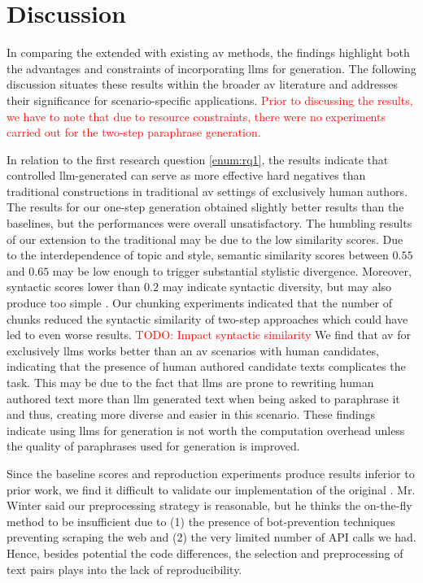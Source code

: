 \chapter{Discussion}
\label{chap:discussion}

In comparing the extended \impAppr{} with existing \ac{av} methods, the findings highlight both the advantages and constraints of incorporating \acp{llm} for \imp{} generation. 
The following discussion situates these results within the broader \ac{av} literature and addresses their significance for scenario-specific applications.
\textcolor{red}{Prior to discussing the results, we have to note that due to resource constraints, there were no experiments carried out for the two-step paraphrase \imp{} generation.}

In relation to the first research question \autoref{enum:rq1}, the results indicate that controlled \ac{llm}-generated \imps{} can serve as more effective hard negatives than traditional constructions in traditional \ac{av} settings of exclusively human authors.
The results for our one-step \imp{} generation obtained slightly better results than the baselines, but the performances were overall unsatisfactory.
The humbling results of our extension to the traditional \impAppr{} may be due to the low similarity scores.
Due to the interdependence of topic and style, semantic similarity scores between $0.55$ and $0.65$ may be low enough to trigger substantial stylistic divergence.
Moreover, syntactic scores lower than $0.2$ may indicate syntactic diversity, but may also produce too simple \imps{}.
Our chunking experiments indicated that the number of chunks reduced the syntactic similarity of two-step approaches which could have led to even worse results.
\textcolor{red}{TODO: Impact syntactic similarity}
We find that \ac{av} for exclusively \acp{llm} works better than an \ac{av} scenarios with human candidates, indicating that the presence of human authored candidate texts complicates the task.
This may be due to the fact that \acp{llm} are prone to rewriting human authored text more than \ac{llm} generated text when being asked to paraphrase it and thus, creating more diverse and easier \imps{} in this scenario.
These findings indicate using \acp{llm} for \imps{} generation is not worth the computation overhead unless the quality of paraphrases used for \imp{} generation is improved.

Since the baseline scores and reproduction experiments produce results inferior to prior work, we find it difficult to validate our implementation of the original \impAppr{}.
Mr. Winter said our preprocessing strategy is reasonable, but he thinks the on-the-fly method to be insufficient due to (1) the presence of bot-prevention techniques preventing scraping the web and (2) the very limited number of API calls we had.
Hence, besides potential the code differences, the selection and preprocessing of text pairs plays into the lack of reproducibility.

